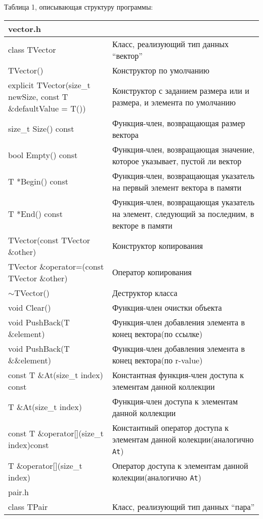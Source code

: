 Таблица 1, описывающая структуру программы:
\begin{longtable}{|p{7.5cm}|p{7.5cm}|}
\hline
\rowcolor{lightgray}
\multicolumn{2}{|c|} {vector.h}\\
\hline
class TVector&Класс, реализующий тип данных \enquote{вектор}\\
\hline
TVector()&Конструктор по умолчанию\\
\hline
explicit TVector(size\_t newSize, const T \&defaultValue = T())&Конструктор с заданием размера или и размера, и элемента по умолчанию\\
\hline
size\_t Size() const&Функция-член, возвращающая размер вектора\\
\hline
bool Empty() const&Функция-член, возвращающая значение, которое указывает, пустой ли вектор\\
\hline
T *Begin() const&Функция-член, возвращающая указатель на первый элемент вектора в памяти\\
\hline
T *End() const&Функция-член, возвращающая указатель на элемент, следующий за последним, в векторе в памяти\\
\hline
TVector(const TVector \&other)&Конструктор копирования\\
\hline
TVector \&operator=(const TVector \&other)&Оператор копирования\\
\hline
$\sim{}$TVector()&Деструктор класса\\
\hline
void Clear()&Функция-член очистки объекта\\
\hline
void PushBack(T \&element)&Функция-член добавления элемента в конец вектора(по ссылке)\\
\hline
void PushBack(T \&\&element)&Функция-член добавления элемента в конец вектора(по r-value)\\
\hline
const T \&At(size\_t index) const&Константная функция-член доступа к элементам данной коллекции\\
\hline
T \&At(size\_t index) &Функция-член доступа к элементам данной коллекции\\
\hline
const T \&operator[](size\_t index)const &Константный оператор доступа к элементам данной колекции(аналогично \texttt{At})\\
\hline
T \&operator[](size\_t index)&Оператор доступа к элементам данной колекции(аналогично \texttt{At})\\
\hline
\rowcolor{lightgray}
\multicolumn{2}{|c|} {pair.h}\\
\hline
class TPair&Класс, реализующий тип данных \enquote{пара}\\

\end{longtable}
